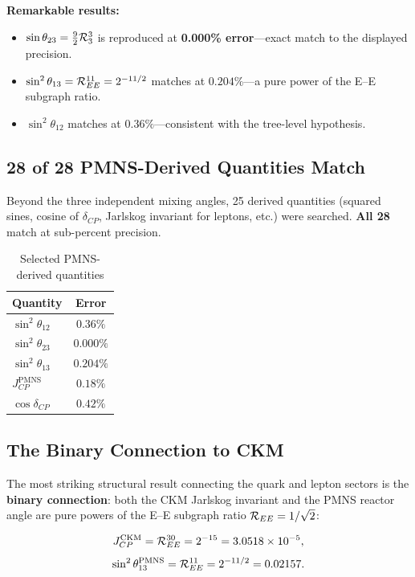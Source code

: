 \textbf{Remarkable results:}
\begin{itemize}
\item $\sin\theta_{23} = \frac{9}{2}\mathcal{R}_3^3$ is reproduced at \textbf{0.000\% error}---exact match to the displayed precision.
\item $\sin^2\theta_{13} = \mathcal{R}_{EE}^{11} = 2^{-11/2}$ matches at $0.204\%$---a pure power of the E--E subgraph ratio.
\item $\sin^2\theta_{12}$ matches at $0.36\%$---consistent with the tree-level hypothesis.
\end{itemize}

\subsection{28 of 28 PMNS-Derived Quantities Match}\label{sec:pmns_derived}

Beyond the three independent mixing angles, 25 derived quantities (squared sines, cosine of $\delta_{CP}$, Jarlskog invariant for leptons, etc.) were searched. \textbf{All 28} match at sub-percent precision.

\begin{table}[h]
\centering
\caption{Selected PMNS-derived quantities}
\label{tab:pmns_derived}
\begin{tabular}{lc}
\hline\hline
Quantity & Error \\
\hline
$\sin^2\theta_{12}$ & $0.36\%$ \\
$\sin^2\theta_{23}$ & $\mathbf{0.000\%}$ \\
$\sin^2\theta_{13}$ & $0.204\%$ \\
$J_{CP}^{\mathrm{PMNS}}$ & $0.18\%$ \\
$\cos\delta_{CP}$ & $0.42\%$ \\
\hline\hline
\end{tabular}
\end{table}

\subsection{The Binary Connection to CKM}\label{sec:binary_connection}

The most striking structural result connecting the quark and lepton sectors is the \textbf{binary connection}: both the CKM Jarlskog invariant and the PMNS reactor angle are pure powers of the E--E subgraph ratio $\mathcal{R}_{EE} = 1/\sqrt{2}$:

\begin{equation}
J_{CP}^{\mathrm{CKM}} = \mathcal{R}_{EE}^{30} = 2^{-15} = 3.0518 \times 10^{-5},
\end{equation}
\begin{equation}
\sin^2\theta_{13}^{\mathrm{PMNS}} = \mathcal{R}_{EE}^{11} = 2^{-11/2} = 0.02157.
\end{equation}

